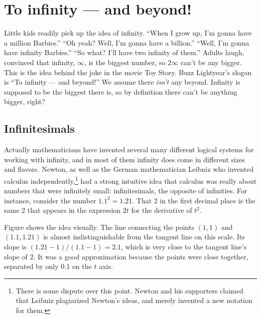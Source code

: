 \chapter{To infinity --- and beyond!}

Little kids readily pick up the idea of infinity.
``When I grow up, I'm
gonna have a million Barbies.'' ``Oh yeah? Well, I'm gonna have a billion.''
``Well, I'm gonna have infinity Barbies.'' ``So what? I'll have two infinity of them.''
Adults laugh, convinced that infinity, $\infty$, is the biggest number, so $2\infty$
can't be any bigger. This is the idea behind the joke in the movie Toy Story. Buzz
Lightyear's slogan is ``To infinity --- and beyond!'' We assume there \emph{isn't}
any beyond. Infinity is supposed to be the biggest there is, so by definition there
can't be anything bigger, right?

\section{Infinitesimals}

%
Actually mathematicians have invented several many different logical systems for working
with infinity, and in most of them infinity does come in different sizes and flavors.
Newton, as well as the German mathematician Leibniz
who invented calculus independently,\footnote{There is
some dispute over this point. Newton and his supporters claimed that Leibniz plagiarized Newton's
ideas, and merely invented a new notation for them.}
had a strong intuitive idea that calculus was really about numbers that were infinitely
small: infinitesimals, the opposite of infinities. For instance, consider
the number $1.1^2=1.21$. That 2 in the first decimal place is the same 2 that
appears in the expression $2t$ for the derivative of $t^2$.


Figure   shows the idea visually. The line connecting the points $(1,1)$ and $(1.1,1.21)$ is almost
indistinguishable from the tangent line on this scale. Its slope is $(1.21-1)/(1.1-1)=2.1$, which is very close to the
tangent line's slope of 2. It was a good approximation because the points were close together, separated by only
0.1 on the $t$ axis.

